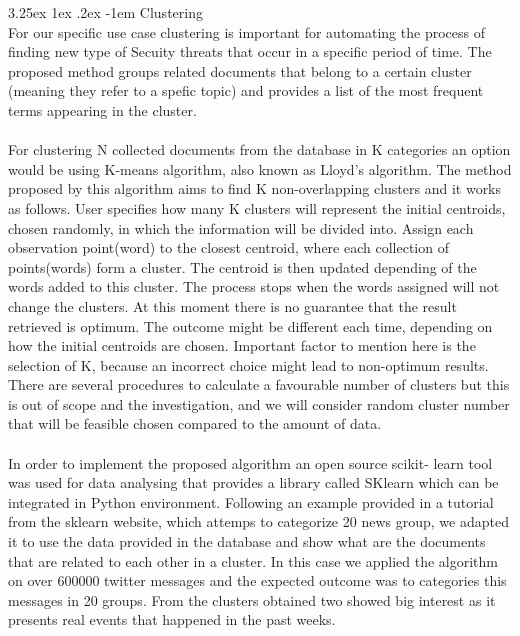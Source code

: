 \documentclass[12pt]{article}
\makeatletter
\renewcommand\paragraph{\@startsection{paragraph}{5}{\z@}%
  {3.25ex \@plus1ex \@minus.2ex}%
  {-1em}%
  {\normalfont\normalsize\bfseries}}
\makeatother
\begin{document}
\paragraph{Clustering}
\hfill \break 
\\
For our specific use case clustering is important for automating the process of finding new type of Secuity threats that occur in a specific period of time. The proposed method groups related documents that belong to a certain cluster (meaning they refer to a spefic topic) and provides a list of the most frequent terms appearing in the cluster.
\\
\\
For clustering N collected documents from the database in K categories an option would be using K-means\cite{k-means} algorithm, also known as Lloyd's algorithm. The method\cite{k-means-example} proposed by this algorithm aims to find K non-overlapping clusters and it works as follows. User specifies how many K clusters will represent the initial centroids, chosen randomly, in which the information will be divided into. Assign each observation point(word) to the closest centroid, where each collection of points(words) form a cluster. The centroid is then updated depending of the words added to this cluster. The process stops when the words assigned will not change the clusters. At this moment there is no guarantee that the result retrieved is optimum. The outcome might be different each time, depending on how the initial centroids are chosen. Important factor to mention here is the selection of K, because an incorrect choice might lead to non-optimum results. There are several procedures\cite{procedures-for-kmeans} to calculate a favourable number of clusters but this is out of scope and the investigation, and we will consider random cluster number that will be feasible chosen compared to the amount of data.
\\
\\
In order to implement the proposed algorithm an open  source scikit- learn \cite{sklearn} tool was used for data analysing that provides a library called SKlearn which can be integrated in Python environment. Following an example provided in a tutorial from the sklearn website, which attemps to categorize 20 news group\cite{k-means-20news}, we adapted it to use the data provided in the database and show what are the documents that are related to each other in a cluster.  In this case we applied the algorithm on over 600000 twitter messages and the expected outcome was to categories this messages in 20 groups. From the clusters obtained two showed big interest as it presents real events that happened in the past weeks.
\end{document}
